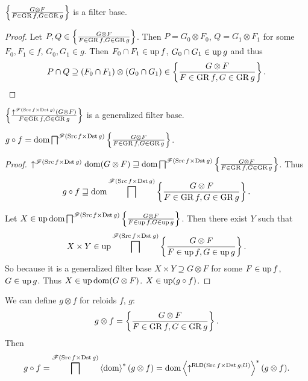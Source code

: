 \begin{lem}
$\setcond{G\otimes F}{F\in\GR f,G\in\GR g}$ is a filter base.\end{lem}
\begin{proof}
Let $P,Q\in\setcond{G\otimes F}{F\in\GR f,G\in\GR g}$. Then $P=G_{0}\otimes F_{0}$,
$Q=G_{1}\otimes F_{1}$ for some $F_{0},F_{1}\in f$, $G_{0},G_{1}\in g$.
Then $F_{0}\cap F_{1}\in\up f$, $G_{0}\cap G_{1}\in\up g$ and thus
\[
P\cap Q\supseteq(F_{0}\cap F_{1})\otimes(G_{0}\cap G_{1})\in\setcond{G\otimes F}{F\in\GR f,G\in\GR g}.
\]
\end{proof}
\begin{cor}
$\setcond{\uparrow^{\mathscr{F}(\Src f\times\Dst g)}(G\otimes F)}{F\in\GR f,G\in\GR g}$
is a generalized filter base.\end{cor}
\begin{prop}
$g\circ f=\dom\bigsqcap^{\mathscr{F}(\Src f\times\Dst g)}\setcond{G\otimes F}{F\in\GR f,G\in\GR g}$.\end{prop}
\begin{proof}
$\uparrow^{\mathscr{F}(\Src f\times\Dst g)}\dom(G\otimes F)\sqsupseteq\dom\bigsqcap^{\mathscr{F}(\Src f\times\Dst g)}\setcond{G\otimes F}{F\in\GR f,G\in\GR g}$.
Thus
\[
g\circ f\sqsupseteq\dom\bigsqcap^{\mathscr{F}(\Src f\times\Dst g)}\setcond{G\otimes F}{F\in\GR f,G\in\GR g}.
\]


Let $X\in\up\dom\bigsqcap^{\mathscr{F}(\Src f\times\Dst g)}\setcond{G\otimes F}{F\in\up f,G\in\up g}$.
Then there exist $Y$ such that
\[
X\times Y\in\up\bigsqcap^{\mathscr{F}(\Src f\times\Dst g)}\setcond{G\otimes F}{F\in\up f,G\in\up g}.
\]
So because it is a generalized filter base $X\times Y\supseteq G\otimes F$
for some $F\in\up f$, $G\in\up g$. Thus $X\in\up\dom(G\otimes F)$.
$X\in\up(g\circ f)$.
\end{proof}
We can define $g\otimes f$ for reloids $f$, $g$:
\[
g\otimes f=\setcond{G\otimes F}{F\in\GR f,G\in\GR g}.
\]
Then
\[
g\circ f=\bigsqcap^{\mathscr{F}(\Src f\times\Dst g)}\rsupfun{\dom}(g\otimes f)=\dom\rsupfun{\uparrow^{\mathsf{RLD}(\Src f\times\Dst g;\mho)}}(g\otimes f).
\]



